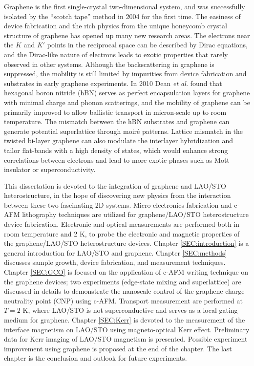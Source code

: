 \documentclass[pdflatex, sectionletters, 12pt, final, phd]{pittetd}    %
\begin{document}
Graphene is the first single-crystal two-dimensional system, and was successfully isolated by the ``scotch tape'' method in 2004\cite{novoselov2004electric} for the first time. The easiness of device fabrication and the rich physics from the unique honeycomb crystal structure of graphene has opened up many new research areas. The electrons near the $K$ and $K'$ points in the reciprocal space can be described by Dirac equations\cite{wallace1947band, neto2009electronic}, and the Dirac-like nature of electrons\cite{novoselov2004electric, zhang2005experimental} leads to exotic properties that rarely observed in other systems. Although the backscattering in graphene is suppressed\cite{ando1998berry}, the mobility is still limited by impurities from device fabrication and substrates in early graphene experiments. In 2010 Dean \textit{et al.} found that hexagonal boron nitride (hBN) serves as perfect encapsulation layers for graphene with minimal charge and phonon scatterings\cite{dean2010naturenano}, and the mobility of graphene can be primarily improved to allow ballistic transport in micron-scale up to room temperature\cite{mayorov2011micrometer}. The mismatch between the hBN substrates and graphene can generate potential superlattice through moir{\'e} patterns. Lattice mismatch in the twisted bi-layer graphene can also modulate the interlayer hybridization and tailor flat-bands with a high density of states, which would enhance strong correlations between electrons and lead to more exotic phases such as Mott insulator\cite{cao2016superlattice, cao2018correlated, chen2018gate} or superconductivity\cite{cao2018unconventional}.

This dissertation is devoted to the integration of graphene and LAO/STO heterostructure, in the hope of discovering new physics from the interaction between these two fascinating 2D systems. Micro-electronics fabrication and c-AFM lithography techniques are utilized for graphene/LAO/STO heterostructure device fabrication. Electronic and optical measurements are performed both in room temperature and 2 K, to probe the electronic and magnetic properties of the graphene/LAO/STO heterostructure devices. Chapter \ref{SEC:introduction} is a general introduction for LAO/STO and graphene. Chapter \ref{SEC:methods} discusses sample growth, device fabrication, and measurement techniques. Chapter \ref{SEC:GCO} is focused on the application of c-AFM writing technique on the graphene devices; two experiments (edge-state mixing and superlattice) are discussed in details to demonstrate the nanoscale control of the graphene charge neutrality point (CNP) using c-AFM. Transport measurement are performed at $T = 2$ K, where LAO/STO is not superconductive and serves as a local gating medium for graphene. Chapter \ref{SEC:Kerr} is devoted to the measurement of the interface magnetism on LAO/STO using magneto-optical Kerr effect. Preliminary data for Kerr imaging of LAO/STO magnetism is presented. Possible experiment improvement using graphene is proposed at the end of the chapter. The last chapter is the conclusion and outlook for future experiments.
\end{document}
